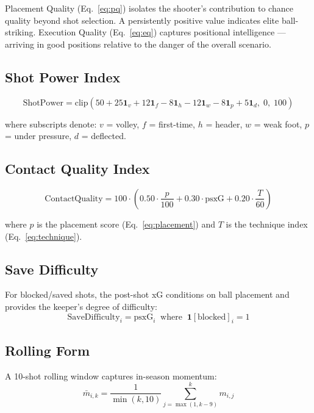 \documentclass[12pt,a4paper]{article}
\begin{document}
Placement Quality (Eq.~\ref{eq:pq}) isolates the shooter's contribution to chance quality beyond shot selection. A persistently positive value indicates elite ball-striking. Execution Quality (Eq.~\ref{eq:eq}) captures positional intelligence --- arriving in good positions relative to the danger of the overall scenario.

\subsection{Shot Power Index}

\begin{equation}
\text{ShotPower} = \text{clip}\!\left(50 + 25\mathbf{1}_v + 12\mathbf{1}_f - 8\mathbf{1}_h - 12\mathbf{1}_w - 8\mathbf{1}_p + 5\mathbf{1}_d,\; 0,\; 100\right)
\label{eq:power}
\end{equation}

where subscripts denote: $v$ = volley, $f$ = first-time, $h$ = header, $w$ = weak foot, $p$ = under pressure, $d$ = deflected.

\subsection{Contact Quality Index}

\begin{equation}
\text{ContactQuality} = 100 \cdot \!\left(0.50 \cdot \frac{p}{100} + 0.30 \cdot \text{psxG} + 0.20 \cdot \frac{T}{60}\right)
\label{eq:cq}
\end{equation}

where $p$ is the placement score (Eq.~\ref{eq:placement}) and $T$ is the technique index (Eq.~\ref{eq:technique}).

\subsection{Save Difficulty}

For blocked/saved shots, the post-shot xG conditions on ball placement and provides the keeper's degree of difficulty:
\begin{equation}
\text{SaveDifficulty}_i = \text{psxG}_i \;\;\text{where}\;\; \mathbf{1}[\text{blocked}]_i = 1
\end{equation}

\subsection{Rolling Form}

A 10-shot rolling window captures in-season momentum:
\begin{equation}
\bar{m}_{i,k} = \frac{1}{\min(k,10)}\sum_{j=\max(1,k-9)}^{k} m_{i,j}
\end{equation}
\end{document}
